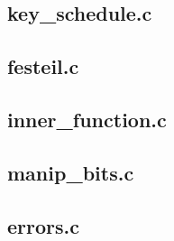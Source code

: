 \documentclass[11pt]{article}
\begin{document}
\newpage

\subsection{key\_schedule.c} 

 \newpage

\subsection{festeil.c} 

 \newpage

\subsection{inner\_function.c} 

 \newpage

\subsection{manip\_bits.c} 

 \newpage

\subsection{errors.c} 

 \newpage
\end{document}

